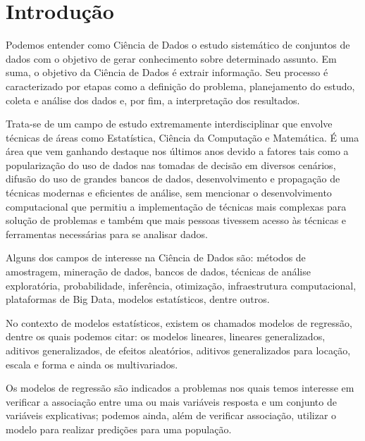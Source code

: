 \chapter{Introdução}

\label{cap:intro}



Podemos entender como Ciência de Dados o estudo sistemático de conjuntos de dados com o objetivo de gerar conhecimento sobre determinado assunto. Em suma, o objetivo da Ciência de Dados é extrair informação. Seu processo é caracterizado por etapas como a definição do problema, planejamento do estudo, coleta e análise dos dados e, por fim, a interpretação dos resultados.

Trata-se de um campo de estudo extremamente interdisciplinar que envolve técnicas de áreas como Estatística, Ciência da Computação e Matemática. É uma área que vem ganhando destaque nos últimos anos devido a fatores tais como a popularização do uso de dados nas tomadas de decisão em diversos cenários, difusão do uso de grandes bancos de dados, desenvolvimento e propagação de técnicas modernas e eficientes de análise, sem mencionar o desenvolvimento computacional que permitiu a implementação de técnicas mais complexas para solução de problemas e também que mais pessoas tivessem acesso às técnicas e ferramentas necessárias para se analisar dados.

Alguns dos campos de interesse na Ciência de Dados são: métodos de amostragem, mineração de dados, bancos de dados, técnicas de análise exploratória, probabilidade, inferência, otimização, infraestrutura computacional, plataformas de Big Data, modelos estatísticos, dentre outros.

No contexto de modelos estatísticos, existem os chamados modelos de regressão, dentre os quais podemos citar: os modelos lineares, lineares generalizados, aditivos generalizados, de efeitos aleatórios, aditivos generalizados para locação, escala e forma e ainda os multivariados.

Os modelos de regressão são indicados a problemas nos quais temos interesse em verificar a associação entre uma ou mais variáveis resposta e um conjunto de variáveis explicativas; podemos ainda, além de verificar associação, utilizar o modelo para realizar predições para uma população.

